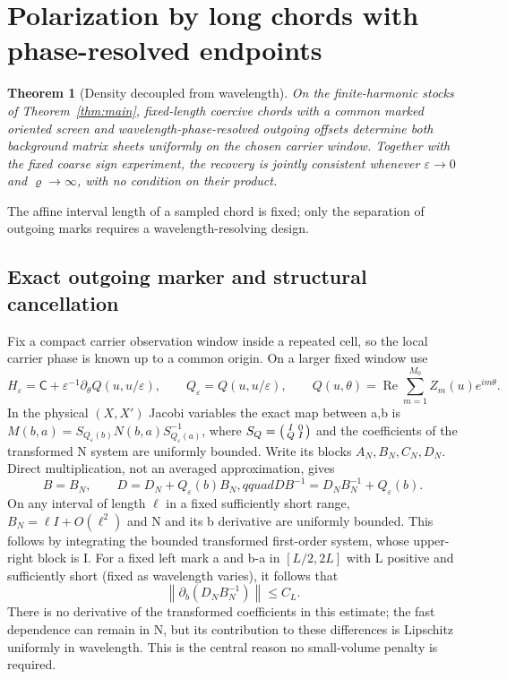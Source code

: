 \documentclass[11pt]{article}
\newtheorem{theorem}{Theorem}
\begin{document}
\section{Polarization by long chords with phase-resolved endpoints}\label{sec:longcarrier}
\begin{theorem}[Density decoupled from wavelength]\label{thm:longcarrier}
On the finite-harmonic stocks of Theorem~\ref{thm:main}, fixed-length
coercive chords with a common marked oriented screen and
wavelength-phase-resolved outgoing offsets determine both
background matrix sheets uniformly on the chosen carrier window.
Together with the fixed coarse sign experiment, the recovery is
jointly consistent whenever \(\varepsilon\to0\) and
\(\varrho\to\infty\), with no condition on their product.
\end{theorem}
The affine interval length of a sampled chord is fixed; only the
separation of outgoing marks requires a wavelength-resolving design.
\subsection{Exact outgoing marker and structural cancellation}\label{exact-outgoing-marker-and-structural-cancellation}

Fix a compact carrier observation window inside a repeated cell, so the local carrier phase is known up to a common origin. On a larger fixed window use
\[
 H_\varepsilon=\mathsf C+\varepsilon^{-1}\partial_\theta Q(u,u/\varepsilon),
 \qquad Q_\varepsilon=Q(u,u/\varepsilon),\qquad
 Q(u,\theta)=\operatorname{Re}\sum_{m=1}^{M_0}Z_m(u)e^{im\theta}.
\]
In the physical \((X,X')\) Jacobi variables the exact map between a,b is
\(M(b,a)=S_{Q_\varepsilon(b)}N(b,a)S_{Q_\varepsilon(a)}^{-1}\),
where \(S_Q=\begin{psmallmatrix}I&0\\ Q&I\end{psmallmatrix}\) and the coefficients of the transformed N system are uniformly bounded. Write its blocks \(A_N,B_N,C_N,D_N\). Direct multiplication, not an averaged approximation, gives
\[
 B=B_N,\qquad D=D_N+Q_\varepsilon(b)B_N,qquad
 D B^{-1}=D_N B_N^{-1}+Q_\varepsilon(b).
\]
On any interval of length \(\ell\) in a fixed sufficiently short range,
\(B_N=\ell I+O(\ell^2)\) and N and its b derivative are uniformly bounded. This follows by integrating the bounded transformed first-order system, whose upper-right block is I. For a fixed left mark a and b-a in \([L/2,2L]\) with L positive and sufficiently short (fixed as wavelength varies), it follows that
\[
 \left\|\partial_b(D_N B_N^{-1})\right\|\le C_L .
\]
There is no derivative of the transformed coefficients in this estimate; the fast dependence can remain in N, but its contribution to these differences is Lipschitz uniformly in wavelength. This is the central reason no small-volume penalty is required.
\end{document}

